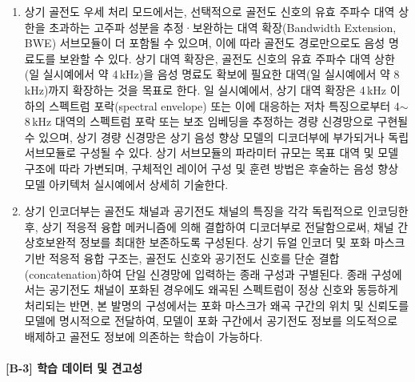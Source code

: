 \documentclass{article}
\DeclareRobustCommand{\codexedit}[1]{\textcolor{customorange}{#1}}
\begin{document}
\begin{enumerate}[label = \textbf{(B.2.\arabic*)}]
    \item \codexedit{상기 골전도 우세 처리 모드에서는, 선택적으로
    골전도 신호의 유효 주파수 대역 상한을 초과하는
    고주파 성분을 추정·보완하는 대역 확장(Bandwidth Extension, BWE)
    서브모듈이 더 포함될 수 있으며, 이에 따라 골전도
    경로만으로도 음성 명료도를 보완할 수 있다.
    상기 대역 확장은, 골전도 신호의 유효 주파수 대역 상한(일 실시예에서 약 4\,kHz)을
    음성 명료도 확보에 필요한 대역(일 실시예에서 약 8\,kHz)까지 확장하는 것을 목표로 한다.
    일 실시예에서, 상기 대역 확장은 4\,kHz 이하의 스펙트럼 포락(spectral envelope) 또는
    이에 대응하는 저차 특징으로부터 4$\sim$8\,kHz 대역의 스펙트럼 포락 또는 보조 임베딩을
    추정하는 경량 신경망으로 구현될 수 있으며, 상기 경량 신경망은 상기 음성 향상 모델의
    디코더부에 부가되거나 독립 서브모듈로 구성될 수 있다. 상기 서브모듈의 파라미터 규모는
    목표 대역 및 모델 구조에 따라 가변되며, 구체적인 레이어 구성 및 훈련 방법은 후술하는
    음성 향상 모델 아키텍처 실시예에서 상세히 기술한다.}


    \item 상기 인코더부는 골전도 채널과 공기전도 채널의 특징을 각각
    독립적으로 인코딩한 후, 상기 적응적 융합 메커니즘에 의해 결합하여
    디코더부로 전달함으로써, 채널 간 상호보완적 정보를 최대한 보존하도록
    구성된다. 상기 듀얼 인코더 및 포화 마스크 기반 적응적 융합 구조는, 골전도 신호와 공기전도 신호를 단순 결합(concatenation)하여 단일 신경망에 입력하는 종래 구성과 구별된다. 종래 구성에서는 공기전도 채널이 포화된 경우에도 왜곡된 스펙트럼이 정상 신호와 동등하게 처리되는 반면, 본 발명의 구성에서는 포화 마스크가 왜곡 구간의 위치 및 신뢰도를 모델에 명시적으로 전달하여, 모델이 포화 구간에서 공기전도 정보를 의도적으로 배제하고 골전도 정보에 의존하는 학습이 가능하다.

\end{enumerate}


\paragraph{[B-3] 학습 데이터 및 견고성}
\end{document}
